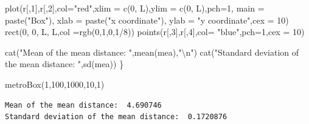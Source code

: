 \documentclass[11pt]{article}
\newenvironment{Shaded}{}{}
\newcommand{\DecValTok}[1]{\textcolor[rgb]{0.25,0.63,0.44}{{#1}}}
\newcommand{\StringTok}[1]{\textcolor[rgb]{0.25,0.44,0.63}{{#1}}}
\newcommand{\FunctionTok}[1]{\textcolor[rgb]{0.02,0.16,0.49}{{#1}}}
\newcommand{\NormalTok}[1]{{#1}}
\newcommand{\SpecialCharTok}[1]{\textcolor[rgb]{0.25,0.44,0.63}{{#1}}}
\newcommand{\AttributeTok}[1]{\textcolor[rgb]{0.49,0.56,0.16}{{#1}}}
\begin{document}
\begin{Shaded}
\begin{Highlighting}[]
    \FunctionTok{plot}\NormalTok{(r[,}\DecValTok{1}\NormalTok{],r[,}\DecValTok{2}\NormalTok{],}\AttributeTok{col=}\StringTok{"red"}\NormalTok{,}\AttributeTok{xlim =} \FunctionTok{c}\NormalTok{(}\DecValTok{0}\NormalTok{, L),}\AttributeTok{ylim =} \FunctionTok{c}\NormalTok{(}\DecValTok{0}\NormalTok{, L),}\AttributeTok{pch=}\DecValTok{1}\NormalTok{,}
         \AttributeTok{main =} \FunctionTok{paste}\NormalTok{(}\StringTok{"Box"}\NormalTok{),}
         \AttributeTok{xlab =} \FunctionTok{paste}\NormalTok{(}\StringTok{"x coordinate"}\NormalTok{), }\AttributeTok{ylab =} \StringTok{"y coordinate"}\NormalTok{,}\AttributeTok{cex =} \DecValTok{10}\NormalTok{)}
    \FunctionTok{rect}\NormalTok{(}\DecValTok{0}\NormalTok{, }\DecValTok{0}\NormalTok{, L, L,}\AttributeTok{col =}\FunctionTok{rgb}\NormalTok{(}\DecValTok{0}\NormalTok{,}\DecValTok{1}\NormalTok{,}\DecValTok{0}\NormalTok{,}\DecValTok{1}\SpecialCharTok{/}\DecValTok{8}\NormalTok{))}
    \FunctionTok{points}\NormalTok{(r[,}\DecValTok{3}\NormalTok{],r[,}\DecValTok{4}\NormalTok{],}\AttributeTok{col=} \StringTok{"blue"}\NormalTok{,}\AttributeTok{pch=}\DecValTok{1}\NormalTok{,}\AttributeTok{cex =} \DecValTok{10}\NormalTok{)}
    
    \FunctionTok{cat}\NormalTok{(}\StringTok{"Mean of the mean distance: "}\NormalTok{,}\FunctionTok{mean}\NormalTok{(mea),}\StringTok{"}\SpecialCharTok{\textbackslash{}n}\StringTok{"}\NormalTok{)}
    \FunctionTok{cat}\NormalTok{(}\StringTok{"Standard deviation of the mean distance: "}\NormalTok{,}\FunctionTok{sd}\NormalTok{(mea))}
\NormalTok{\}}
\end{Highlighting}
\end{Shaded}

\begin{Shaded}
\begin{Highlighting}[]
\FunctionTok{metroBox}\NormalTok{(}\DecValTok{1}\NormalTok{,}\DecValTok{100}\NormalTok{,}\DecValTok{1000}\NormalTok{,}\DecValTok{10}\NormalTok{,}\DecValTok{1}\NormalTok{)}
\end{Highlighting}
\end{Shaded}

\begin{verbatim}
Mean of the mean distance:  4.690746 
Standard deviation of the mean distance:  0.1720876
\end{verbatim}
\end{document}
